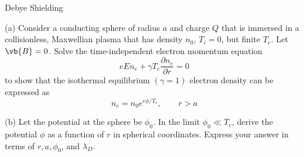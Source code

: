\documentclass[12pt]{article}
\begin{document}
\begin{problem}[Problem 5.]{Debye Shielding}
    
(a) Consider a conducting sphere of radius $a$ and charge $Q$ that is immersed
in a collisionless, Maxwellian plasma that has density $n_0$, $T_i=0$, but
finite $T_e$. Let $\vb{B}=0$. Solve the time-independent electron momentum
equation
\begin{equation}
    eEn_e+\gamma T_e\frac{\partial n_e}{\partial r}=0 
\end{equation}
to show that the isothermal equilibrium $(\gamma=1)$ electron density can be
expressed as
\begin{equation}
    n_e=n_0e^{e\phi/T_e},\qquad r>a 
\end{equation}

(b) Let the potential at the sphere be $\phi_0$. In the limit $\phi_0\ll T_e$,
derive the potential $\phi$ as a function of $r$ in spherical coordinates.
Express your answer in terms of $r,a,\phi_0$, and $\lambda_D$.

\end{problem}
\end{document}
